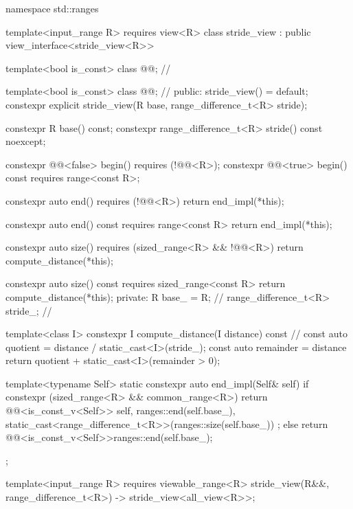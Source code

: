 \begin{codeblock}
namespace std::ranges {
  template<input_range R>
    requires view<R>
  class stride_view : public view_interface<stride_view<R>> {
    template<bool is_const>
    class @@; // \expos

    template<bool is_const>
    class @@; // \expos
  public:
    stride_view() = default;
    constexpr explicit stride_view(R base, range_difference_t<R> stride);

    constexpr R base() const;
    constexpr range_difference_t<R> stride() const noexcept;

    constexpr @@<false> begin() requires (!@@<R>);
    constexpr @@<true> begin() const requires range<const R>;

    constexpr auto end() requires (!@@<R>)
    { return end_impl(*this); }

    constexpr auto end() const requires range<const R>
    { return end_impl(*this); }

    constexpr auto size() requires (sized_range<R> && !@@<R>)
    { return compute_distance(*this); }

    constexpr auto size() const requires sized_range<const R>
    { return compute_distance(*this); }
  private:
    R base_ = R{};                   // \expos
    range_difference_t<R> stride_{}; // \expos

    template<class I>
    constexpr I compute_distance(I distance) const // \expos
    {
      const auto quotient = distance / static_cast<I>(stride_);
      const auto remainder = distance %
      return quotient + static_cast<I>(remainder > 0);
    }

    template<typename Self>
    static constexpr auto end_impl(Self& self)
    {
      if constexpr (sized_range<R> && common_range<R>) {
        return @@<is_const_v<Self>>{
          self,
          ranges::end(self.base_),
          static_cast<range_difference_t<R>>(ranges::size(self.base_)) %
        };
      }
      else {
        return @@<is_const_v<Self>>{ranges::end(self.base_)};
      }
    }
  };

  template<input_range R>
    requires viewable_range<R>
  stride_view(R&&, range_difference_t<R>) -> stride_view<all_view<R>>;
}
\end{codeblock}

